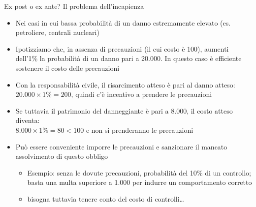 \documentclass[aspectratio=64,11pt]{beamer}
\begin{document}
\begin{frame}{Ex post o ex ante? Il problema dell'incapienza}
\begin{itemize}
\item Nei casi in cui bassa probabilità di un danno estremamente elevato (es. petroliere, centrali nucleari)
\item Ipotizziamo che, in assenza di precauzioni (il cui costo è 100), aumenti dell'1\% la probabilità di un danno pari a 20.000. In questo caso è efficiente sostenere il costo delle precauzioni
\item Con la responsabilità civile, il risarcimento atteso è pari al danno atteso:\\[0pt]
$20.000 \times 1\% = 200$, quindi c'è incentivo a prendere le precauzioni
\item Se tuttavia il patrimonio del danneggiante è pari a 8.000, il costo atteso
diventa:\\[0pt]
$8.000 \times 1\% = 80 < 100$ e non si prenderanno le precauzioni
\item Può essere conveniente imporre le precauzioni e sanzionare il mancato
assolvimento di questo obbligo
\begin{itemize}
\item Esempio: senza le dovute precauzioni, probabilità del 10\% di un controllo;
basta una multa superiore a 1.000 per indurre un comportamento corretto
\item bisogna tuttavia tenere conto del costo di controlli\ldots{}
\end{itemize}
\end{itemize}
\end{frame}
\end{document}
